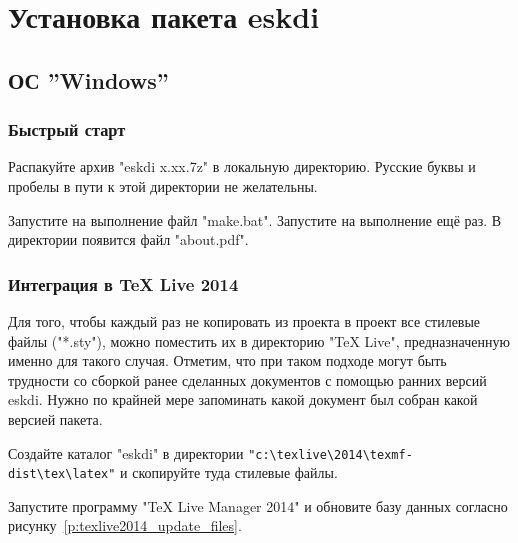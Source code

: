 \section{Установка пакета eskdi}



\subsection{ОС ''Windows''}

\subsubsection{Быстрый старт}

Распакуйте архив "eskdi x.xx.7z" в локальную директорию. Русские буквы и пробелы в пути к этой  директории не желательны.

Запустите на выполнение  файл "make.bat". Запустите на выполнение ещё раз. В директории появится файл "about.pdf".



\subsubsection{Интеграция в TeX Live 2014}

Для того, чтобы каждый раз не копировать из проекта в проект все стилевые файлы ("*.sty"), можно поместить их в директорию  "TeX Live", предназначенную именно для такого случая. Отметим, что при таком подходе могут быть трудности со сборкой ранее сделанных документов с помощью ранних версий eskdi. Нужно по крайней мере запоминать какой документ был собран какой версией пакета.

Создайте каталог "eskdi" в директории \verb|"c:\texlive\2014\texmf-dist\tex\latex"| и скопируйте туда стилевые файлы.

Запустите программу "TeX Live Manager 2014" и обновите базу данных согласно рисунку~\ref{p:texlive2014_update_files}.

